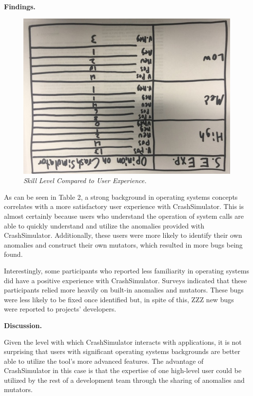 {\bf Findings. }

\begin{figure}[t]
  \center{}
  \includegraphics[scale=.5]{images/table2}
  \caption{\emph{Skill Level Compared to User Experience.}}
  \label{fig-skill-exp}
\end{figure}

As can be seen in Table 2, a strong background in operating systems
concepts correlates with a more satisfactory user experience with
CrashSimulator.  This is almost certainly because users who understand the
operation of system calls are able to quickly understand and utilize the
anomalies provided with CrashSimulator.  Additionally, these users were
more likely to identify their own anomalies and construct their own
mutators, which resulted in more bugs being found.

Interestingly, some participants who reported less familiarity in operating
systems did have a positive experience with CrashSimulator.
Surveys indicated
that these participants relied more heavily on built-in
anomalies and mutators.  These bugs were less likely to be fixed once
identified but, in spite of this, ZZZ new bugs were reported to projects'
developers.


{\bf Discussion. }

Given the level with which CrashSimulator interacts with applications, it
is not surprising that users with significant operating systems backgrounds
are better able to utilize the tool's more advanced features.  The
advantage of CrashSimulator in this case is that the expertise of one
high-level user
could be utilized by the rest of a development team through the sharing of
anomalies and mutators.

